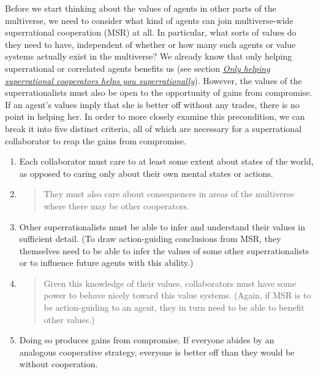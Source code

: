 Before we start thinking about the values of agents in other parts of
the multiverse, we need to consider what kind of agents can join
multiverse-wide superrational cooperation (MSR) at all. In particular,
what sorts of values do they need to have, independent of whether or how
many such agents or value systems actually exist in the multiverse? We
already know that only helping superrational or correlated agents
benefits us (see section
\protect\hyperlink{only-helping-superrational-cooperators-helps-you-superrationally}{\emph{Only
helping superrational cooperators helps you superrationally}}).
However, the values of the superrationalists must also be open to the
opportunity of gains from compromise. If an agent's values imply that
she is better off without any trades, there is no point in helping her.
In order to more closely examine this precondition, we can break it into
five distinct criteria, all of which are necessary for a superrational
collaborator to reap the gains from compromise.

\begin{enumerate}
\def\labelenumi{\arabic{enumi}.}
\item
  Each collaborator must care to at least some extent about states of
  the world, as opposed to caring only about their own mental states or
  actions.
\item
  \begin{quote}
  They must also care about consequences in areas of the multiverse
  where there may be other cooperators.
  \end{quote}
\item
  Other superrationalists must be able to infer and understand their
  values in sufficient detail. (To draw action-guiding conclusions from
  MSR, they themselves need to be able to infer the values of some other
  superrationalists or to influence future agents with this ability.)
\item
  \begin{quote}
  Given this knowledge of their values, collaborators must have some
  power to behave nicely toward this value systems. (Again, if MSR is to
  be action-guiding to an agent, they in turn need to be able to benefit
  other values.)
  \end{quote}
\item
  Doing so produces gains from compromise. If everyone abides by an
  analogous cooperative strategy, everyone is better off than they would
  be without cooperation.
\end{enumerate}

